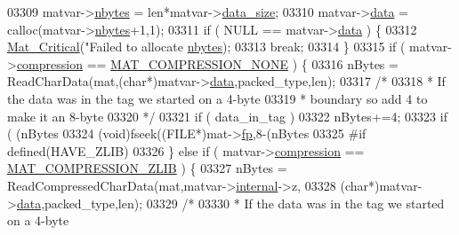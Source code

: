 \begin{DoxyCode}
{{{{{{{{{{{{{{{{03309             matvar->\hyperlink{group___m_a_t_abf1c844540503be2df9bb3db93cfe307}{nbytes} = len*matvar->\hyperlink{group___m_a_t_a9ad1c82e2b568da617e12dc73a26e1f9}{data\_size};
03310             matvar->\hyperlink{group___m_a_t_a5672978efa230bbdecdf38ede781f7fa}{data}   = calloc(matvar->\hyperlink{group___m_a_t_abf1c844540503be2df9bb3db93cfe307}{nbytes}+1,1);
03311             \textcolor{keywordflow}{if} ( NULL == matvar->\hyperlink{group___m_a_t_a5672978efa230bbdecdf38ede781f7fa}{data} ) \{
03312                 \hyperlink{group__mat__util_gaf51f2bfbb5580f575e4dd79757e2b80c}{Mat\_Critical}(\textcolor{stringliteral}{"Failed to allocate %
      \hyperlink{group___m_a_t_abf1c844540503be2df9bb3db93cfe307}{nbytes});
03313                 \textcolor{keywordflow}{break};
03314             \}
03315             \textcolor{keywordflow}{if} ( matvar->\hyperlink{group___m_a_t_aeef0466048621cb2c959ba7f6c774d06}{compression} == \hyperlink{group___m_a_t_gga768c318af97bd2567758ecb001ceb7f4a2280b97631ff5dd24dec55261dc587b6}{MAT\_COMPRESSION\_NONE} ) \{
03316                 nBytes = ReadCharData(mat,(\textcolor{keywordtype}{char}*)matvar->\hyperlink{group___m_a_t_a5672978efa230bbdecdf38ede781f7fa}{data},packed\_type,len);
03317                 \textcolor{comment}{/*}
03318 \textcolor{comment}{                 * If the data was in the tag we started on a 4-byte}
03319 \textcolor{comment}{                 * boundary so add 4 to make it an 8-byte}
03320 \textcolor{comment}{                 */}
03321                 \textcolor{keywordflow}{if} ( data\_in\_tag )
03322                     nBytes+=4;
03323                 \textcolor{keywordflow}{if} ( (nBytes %
03324                     (void)fseek((FILE*)mat->\hyperlink{struct__mat__t_a85f562e407ca9ad4d2a6e14f839432b7}{fp},8-(nBytes %
03325 \textcolor{preprocessor}{#if defined(HAVE\_ZLIB)}
03326             \} \textcolor{keywordflow}{else} \textcolor{keywordflow}{if} ( matvar->\hyperlink{group___m_a_t_aeef0466048621cb2c959ba7f6c774d06}{compression} == \hyperlink{group___m_a_t_gga768c318af97bd2567758ecb001ceb7f4a5181d2f71eab0f12f05ba65d4f13fb53}{MAT\_COMPRESSION\_ZLIB} ) \{
03327                 nBytes = ReadCompressedCharData(mat,matvar->\hyperlink{group___m_a_t_a6e97e3ed9f40c49322c18561c2a94e92}{internal}->z,
03328                              (\textcolor{keywordtype}{char}*)matvar->\hyperlink{group___m_a_t_a5672978efa230bbdecdf38ede781f7fa}{data},packed\_type,len);
03329                 \textcolor{comment}{/*}
03330 \textcolor{comment}{                 * If the data was in the tag we started on a 4-byte}
}}}}}}}}}}}}}}}}}
\end{DoxyCode}
